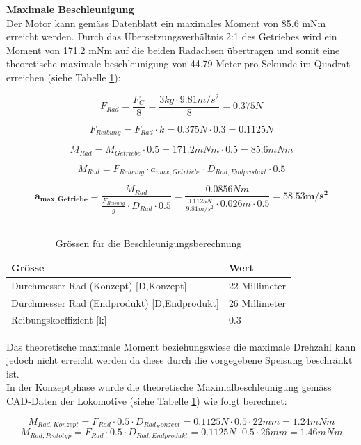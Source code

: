 \documentclass[../../main.tex]{subfiles}
\begin{document}
\pagebreak

\textbf{Maximale Beschleunigung}\\
Der Motor kann gemäss Datenblatt ein maximales Moment von 85.6 mNm erreicht werden. Durch das Übersetzungsverhältnis 2:1 des Getriebes wird ein Moment von 171.2 mNm auf die beiden Radachsen übertragen und somit eine theoretische maximale beschleunigung von 44.79 Meter pro Sekunde im Quadrat erreichen (siehe Tabelle \ref{tab:groessen_beschleunigung}):

$$F_{Rad}=\frac{F_{G}}{8}=\frac{3kg \cdot 9.81m/s^2}{8}=0.375N$$

$$F_{Reibung}=F_{Rad} \cdot k=0.375N \cdot 0.3=0.1125N$$

$$M_{Rad}=M_{Getriebe} \cdot 0.5= 171.2 mNm \cdot 0.5 = 85.6 mNm$$

$$M_{Rad}=F_{Reibung} \cdot a_{max, Getrtiebe} \cdot D_{Rad,Endprodukt} \cdot 0.5$$

$$\boldsymbol{a_{max, Getriebe}}=\frac{M_{Rad}}{\frac{F_{Reibung}}{g} \cdot D_{Rad} \cdot 0.5}=\frac{0.0856Nm}{\frac{0.1125N}{9.81m/s^2} \cdot 0.026m \cdot 0.5}=\boldsymbol{58.53m/s^2}$$\\

\begin{table}[H] \centering
  \begin{tabular}{|l|l|}
  \hline
  \textbf{Grösse} & \textbf{Wert}\\
  \hline
  Durchmesser Rad (Konzept) [D,Konzept]          & 22 Millimeter\\
   \hline
   Durchmesser Rad (Endprodukt) [D,Endprodukt]          & 26 Millimeter\\
   \hline
  Reibungskoeffizient [k]      & 0.3\\
  \hline
  \end{tabular}

  \caption{Grössen für die Beschleunigungsberechnung}
  \label{tab:groessen_beschleunigung}
  \end{table}

Das theoretische maximale Moment beziehungswiese die maximale Drehzahl kann jedoch nicht erreicht werden da diese durch die vorgegebene Speisung beschränkt ist.\\
In der Konzeptphase wurde die theoretische Maximalbeschleunigung gemäss CAD-Daten der Lokomotive (siehe Tabelle \ref{tab:groessen_beschleunigung}) wie folgt berechnet:

$$M_{Rad,Konzept}=F_{Rad} \cdot 0.5 \cdot D_{Rad_Konzept}= 0.1125N \cdot 0.5 \cdot 22mm = 1.24mNm$$
$$M_{Rad,Prototyp}=F_{Rad} \cdot 0.5 \cdot D_{Rad,Endprodukt}= 0.1125N \cdot 0.5 \cdot 26mm = 1.46mNm$$
\end{document}
